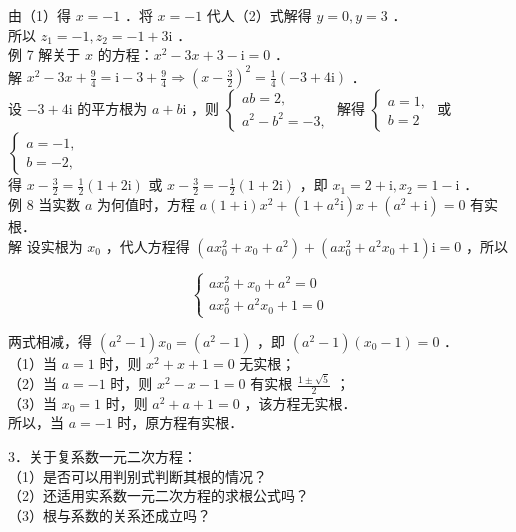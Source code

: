 \documentclass[10pt]{article}
\begin{document}
由（1）得 \(x=-1\) ．将 \(x=-1\) 代人（2）式解得 \(y=0, y=3\) ．\\
所以 \(z_{1}=-1, z_{2}=-1+3 \mathrm{i}\) ．\\
例 7 解关于 \(x\) 的方程：\(x^{2}-3 x+3-\mathrm{i}=0\) ．\\
解 \(x^{2}-3 x+\frac{9}{4}=\mathrm{i}-3+\frac{9}{4} \Rightarrow\left(x-\frac{3}{2}\right)^{2}=\frac{1}{4}(-3+4 \mathrm{i})\) ．\\
设 \(-3+4 \mathrm{i}\) 的平方根为 \(a+b \mathrm{i}\) ，则 \(\left\{\begin{array}{l}a b=2, \\ a^{2}-b^{2}=-3,\end{array}\right.\) 解得 \(\left\{\begin{array}{l}a=1, \\ b=2\end{array}\right.\) 或 \(\left\{\begin{array}{l}a=-1, \\ b=-2,\end{array}\right.\)\\
得 \(x-\frac{3}{2}=\frac{1}{2}(1+2 \mathrm{i})\) 或 \(x-\frac{3}{2}=-\frac{1}{2}(1+2 \mathrm{i})\) ，即 \(x_{1}=2+\mathrm{i}, x_{2}=1-\mathrm{i}\) ．\\
例 8 当实数 \(a\) 为何值时，方程 \(a(1+\mathrm{i}) x^{2}+\left(1+a^{2} \mathrm{i}\right) x+\left(a^{2}+\mathrm{i}\right)=0\) 有实根．\\
解 设实根为 \(x_{0}\) ，代人方程得 \(\left(a x_{0}^{2}+x_{0}+a^{2}\right)+\left(a x_{0}^{2}+a^{2} x_{0}+1\right) \mathrm{i}=0\) ，所以

\[
\left\{\begin{array}{l}
a x_{0}^{2}+x_{0}+a^{2}=0 \\
a x_{0}^{2}+a^{2} x_{0}+1=0
\end{array}\right.
\]

两式相减，得 \(\left(a^{2}-1\right) x_{0}=\left(a^{2}-1\right)\) ，即 \(\left(a^{2}-1\right)\left(x_{0}-1\right)=0\) ．\\
（1）当 \(a=1\) 时，则 \(x^{2}+x+1=0\) 无实根；\\
（2）当 \(a=-1\) 时，则 \(x^{2}-x-1=0\) 有实根 \(\frac{1 \pm \sqrt{5}}{2}\) ；\\
（3）当 \(x_{0}=1\) 时，则 \(a^{2}+a+1=0\) ，该方程无实根．\\
所以，当 \(a=-1\) 时，原方程有实根．

3．关于复系数一元二次方程：\\
（1）是否可以用判别式判断其根的情况？\\
（2）还适用实系数一元二次方程的求根公式吗？\\
（3）根与系数的关系还成立吗？
\end{document}

